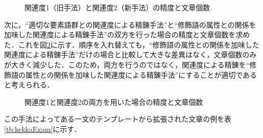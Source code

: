 \begin{figure}[htbp]
	\begin{center}
	  	\epsfxsize=8cm
		\caption{関連度1（旧手法）と関連度2（新手法）の精度と文章個数}
		\label{fig:changeseido}
	\end{center}
\end{figure}
次に，“適切な要素語群との関連度による精錬手法”と“修飾語の属性との関係を加味した関連度による精錬手法”の双方を行った場合の精度と文章個数を求めた．これを図\ref{fig:changeseido2}に示す．順序を入れ替えても，“修飾語の属性との関係を加味した関連度による精錬手法”だけの場合と比較して大きな差異はなく，文章個数のみが大きく減少した．このため，両方を行うのではなく，関連度による精錬を“修飾語の属性との関係を加味した関連度による精錬手法”にすることが適切であると考えられる．
\begin{figure}[htbp]
	\begin{center}
	  	\epsfxsize=8cm
		\caption{関連度1と関連度2の両方を用いた場合の精度と文章個数}
		\label{fig:changeseido2}
	\end{center}
\end{figure}
この手法によってある一文のテンプレートから拡張された文章の例を表\ref{tb:kekkaExam}に示す．

